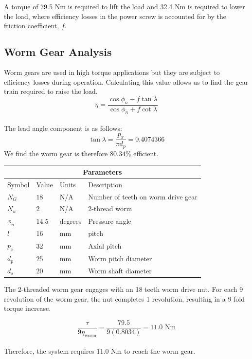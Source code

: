 \documentclass[letterpaper,12pt]{article}
\begin{document}
A torque of 79.5 Nm is required to lift the load and 32.4 Nm is required to lower the load, where efficiency losses in the power screw is accounted for by the friction coefficient, $f$. 
    
\subsection{Worm Gear Analysis}
Worm gears are used in high torque applications but they are subject to efficiency losses during operation. Calculating this value allows us to find the gear train required to raise the load. \\

	\begin{equation}
	\eta = \frac{\cos\phi_n - f\tan\lambda}{\cos\phi_n+f\cot\lambda}
	\end{equation}
\\	
The lead angle component is as follows:
	\begin{equation}
\tan \lambda =  \frac{p_x}{\pi d_p} = 0.4074366
	\end{equation}
We find the worm gear is therefore $80.34 \% $ efficient.
\begin{center}
		\begin{tabular}{ |p{2cm}||p{3cm}|p{2cm}|p{7cm}|  }
			\hline
			\multicolumn{4}{|c|}{Parameters} \\
			\hline
			Symbol& Value & Units & Description\\
			\hline
			$N_G$ & $18$ & N/A & Number of teeth on worm drive gear\\
			$N_w$ & 2 & N/A   & 2-thread worm \\
			$\phi_n$ & 14.5 & degrees &  Pressure angle\\
			$l$ & 16 & mm & pitch\\
			$p_x$ & 32 & mm & Axial pitch\\
			$d_p$ & 25 & mm & Worm pitch diameter\\
			$d_s$ & 20 & mm & Worm shaft diameter\\
			\hline
		\end{tabular}
	\end{center}
The 2-threaded worm gear engages with an 18 teeth worm drive nut. For each 9 revolution of the worm gear, the nut completes 1 revolution, resulting in a 9 fold torque increase. 

$$\frac{\tau }{9 \eta_{\text{worm}}} = \frac{79.5}{9(0.8034)} = 11.0 \text{ Nm}$$
\\
Therefore, the system requires 11.0 Nm to reach the worm gear. 
\end{document}
